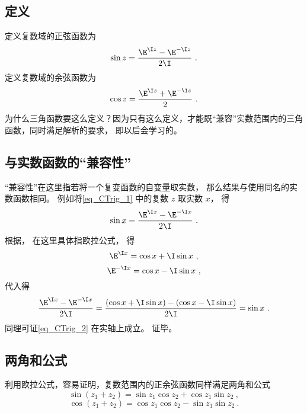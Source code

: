 
\subsection{定义}
定义复数域的正弦函数为
\begin{equation}\label{eq_CTrig_1}
\sin z = \frac{\E^{\I z} - \E^{-\I z}}{2\I}~.
\end{equation}
定义复数域的余弦函数为
\begin{equation}\label{eq_CTrig_2}
\cos z = \frac{\E^{\I z} + \E^{-\I z}}{2}~.
\end{equation}
为什么三角函数要这么定义？因为只有这么定义，才能既“兼容”实数范围内的三角函数，同时满足解析的要求， 即以后会学习的。

\subsection{与实数函数的“兼容性”}
“兼容性”在这里指若将一个复变函数的自变量取实数， 那么结果与使用同名的实数函数相同。 例如将\autoref{eq_CTrig_1} 中的复数 $z$ 取实数 $x$， 得
\begin{equation}
\sin x = \frac{\E^{\I x} - \E^{-\I x}}{2\I}~.
\end{equation} 
根据， 在这里具体指欧拉公式， 得
\begin{equation}
\E^{\I x} = \cos x + \I\sin x~,
\end{equation} 
\begin{equation}
\E^{-\I x} = \cos x - \I \sin x~,
\end{equation} 
代入得
\begin{equation}
\frac{\E^{\I x} - \E^{-\I x}}{2\I} = \frac{(\cos x + \I\sin x) - (\cos x - \I\sin x)}{2\I} = \sin x~.
\end{equation}  
同理可证\autoref{eq_CTrig_2} 在实轴上成立。 证毕。

\subsection{两角和公式}
利用欧拉公式，容易证明，复数范围内的正余弦函数同样满足两角和公式
\begin{equation}\label{eq_CTrig_3}
\sin(z_1 + z_2) = \sin {z_1}\cos {z_2} + \cos {z_1}\sin {z_2}~,
\end{equation}
\begin{equation}\label{eq_CTrig_4}
\cos (z_1 + z_2) = \cos {z_1}\cos {z_2} - \sin {z_1}\sin {z_2}~.
\end{equation}
